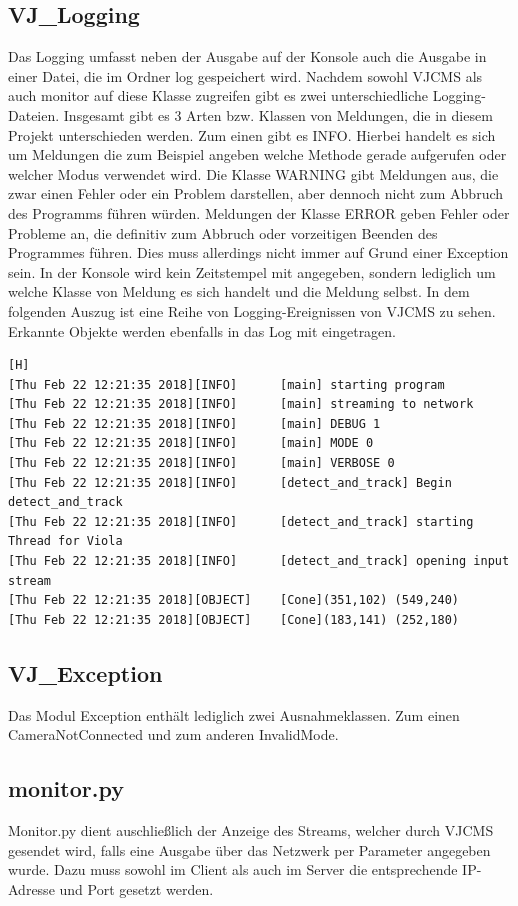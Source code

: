 \subsection{VJ\_Logging}
Das Logging umfasst neben der Ausgabe auf der Konsole auch die Ausgabe in einer Datei, die im Ordner log gespeichert wird. Nachdem sowohl VJCMS als auch monitor auf diese Klasse zugreifen gibt es zwei unterschiedliche Logging-Dateien. Insgesamt gibt es 3 Arten bzw. Klassen von Meldungen, die in diesem Projekt unterschieden werden. Zum einen gibt es INFO. Hierbei handelt es sich um Meldungen die zum Beispiel angeben welche Methode gerade aufgerufen oder welcher Modus verwendet wird. Die Klasse WARNING gibt Meldungen aus, die zwar einen Fehler oder ein Problem darstellen, aber dennoch nicht zum Abbruch des Programms führen würden. Meldungen der Klasse ERROR geben Fehler oder Probleme an, die definitiv zum Abbruch oder vorzeitigen Beenden des Programmes führen. Dies muss allerdings nicht immer auf Grund einer Exception sein. In der Konsole wird kein Zeitstempel mit angegeben, sondern lediglich um welche Klasse von Meldung es sich handelt und die Meldung selbst. In dem folgenden Auszug ist eine Reihe von Logging-Ereignissen von VJCMS zu sehen. Erkannte Objekte werden ebenfalls in das Log mit eingetragen.
\begin{lstlisting}[frame=single,basicstyle=\tiny\ttfamily][H]
[Thu Feb 22 12:21:35 2018][INFO]      [main] starting program
[Thu Feb 22 12:21:35 2018][INFO]      [main] streaming to network
[Thu Feb 22 12:21:35 2018][INFO]      [main] DEBUG 1
[Thu Feb 22 12:21:35 2018][INFO]      [main] MODE 0
[Thu Feb 22 12:21:35 2018][INFO]      [main] VERBOSE 0
[Thu Feb 22 12:21:35 2018][INFO]      [detect_and_track] Begin detect_and_track
[Thu Feb 22 12:21:35 2018][INFO]      [detect_and_track] starting Thread for Viola
[Thu Feb 22 12:21:35 2018][INFO]      [detect_and_track] opening input stream
[Thu Feb 22 12:21:35 2018][OBJECT]    [Cone](351,102) (549,240)
[Thu Feb 22 12:21:35 2018][OBJECT]    [Cone](183,141) (252,180)
\end{lstlisting}

\subsection{VJ\_Exception}
Das Modul Exception enthält lediglich zwei Ausnahmeklassen. Zum einen \glqq CameraNotConnected\grqq {} und zum anderen \glqq InvalidMode\grqq .  


\subsection{monitor.py}
Monitor.py dient auschließlich der Anzeige des Streams, welcher durch VJCMS gesendet wird, falls eine Ausgabe über das Netzwerk per Parameter angegeben wurde. Dazu muss sowohl im Client als auch im Server die entsprechende IP-Adresse und Port gesetzt werden. 

